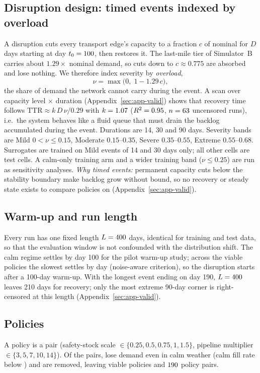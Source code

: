 \documentclass[11pt,a4paper]{article}
\begin{document}
\subsection{Disruption design: timed events indexed by overload}\label{sec:severity}
A disruption cuts every transport edge's capacity to a fraction $c$ of nominal for $D$ days starting at day $t_0=100$, then restores it. The last-mile tier of Simulator~B carries about $1.29\times$ nominal demand, so cuts down to $c\approx0.775$ are absorbed and lose nothing. We therefore index severity by \emph{overload},
\begin{equation}
\nu = \max\bigl(0,\; 1 - 1.29\,c\bigr),
\end{equation}
the share of demand the network cannot carry during the event. A scan over capacity level $\times$ duration (Appendix~\ref{sec:app-valid}) shows that recovery time follows $\mathrm{TTR}\approx k\,D\,\nu/0.29$ with $k=1.07$ ($R^2=0.95$, $n=63$ uncensored runs), i.e.\ the system behaves like a fluid queue that must drain the backlog accumulated during the event. Durations are 14, 30 and 90 days. Severity bands are Mild $0<\nu\le0.15$, Moderate $0.15$--$0.35$, Severe $0.35$--$0.55$, Extreme $0.55$--$0.68$. Surrogates are trained on Mild events of 14 and 30 days only; all other cells are test cells. A calm-only training arm and a wider training band ($\nu\le0.25$) are run as sensitivity analyses. \emph{Why timed events:} permanent capacity cuts below the stability boundary make backlog grow without bound, so no recovery or steady state exists to compare policies on (Appendix~\ref{sec:app-valid}).

\subsection{Warm-up and run length}
Every run has one fixed length $L=400$ days, identical for training and test data, so that the evaluation window is not confounded with the distribution shift. The calm regime settles by day 100 for the pilot warm-up study; across the \PolicyViable{} viable policies the slowest settles by day \SlowestSettleDay{} (noise-aware criterion), so the disruption starts after a 100-day warm-up. With the longest event ending on day 190, $L=400$ leaves 210 days for recovery; only the most extreme 90-day corner is right-censored at this length (Appendix~\ref{sec:app-valid}).

\subsection{Policies}
A policy is a pair (safety-stock scale $\in\{0.25,0.5,0.75,1,1.5\}$, pipeline multiplier $\in\{3,5,7,10,14\}$). Of the \PolicyTotal{} pairs, \PolicyDropped{} lose demand even in calm weather (calm fill rate below \ViableMinCalmFill) and are removed, leaving \PolicyViable{} viable policies and $190$ policy pairs.
\end{document}
